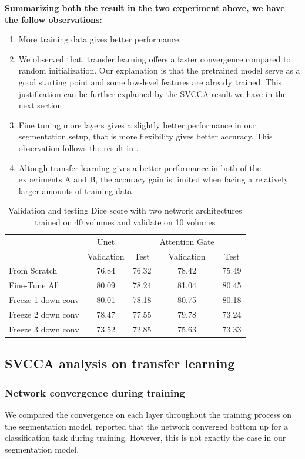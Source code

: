 \textbf{Summarizing both the result in the two experiment above, we have the follow observations:}
\begin{enumerate}
	\item More training data gives better performance.
	\item We observed that, transfer learning offers a faster convergence compared to random initialization. Our explanation is that the pretrained model serve as a good starting point and some low-level features are already trained. This justification can be further explained by the SVCCA result we have in the next section.
	\item Fine tuning more layers gives a slightly better performance in our segmentation setup, that is more flexibility gives better accuracy. This observation follows the result in \cite{wang_improving_2019}.
	\item Altough transfer learning gives a better performance in both   of the experiments A and B, the accuracy gain is limited when facing a relatively larger amounts of training data.
	\end{enumerate}
\begin{table}[h]
	\centering
	\begin{tabular}{l c c c c}
\hline
\hline
				&	Unet		&			&	Attention Gate	&		\\
				&	Validation	&	 Test	&	Validation		&	Test	\\
\hline
From Scratch		&	76.84		&	76.32	&	78.42	&75.49	\\
Fine-Tune All	&	80.09		&	78.24	&	81.04	&80.45	\\
Freeze 1 down conv	&	80.01	&	78.18	&	80.75	&80.18	\\
Freeze 2 down conv	&	78.47	&	77.55	&	79.78	&73.24	\\
Freeze 3 down conv	&	73.52	&	72.85	&	75.63	&73.33	\\
\hline
\end{tabular}
\caption{Validation and testing Dice score with two network architectures trained on 40 volumes and validate on 10 volumes}
\end{table}
	


\subsection{SVCCA analysis on transfer learning}

\subsubsection{Network convergence during training}
We compared the convergence on each layer throughout the training process on the segmentation model. \cite{transfusion} reported that the network converged bottom up for a classification task during training. However, this is not exactly the case in our segmentation model.\\


